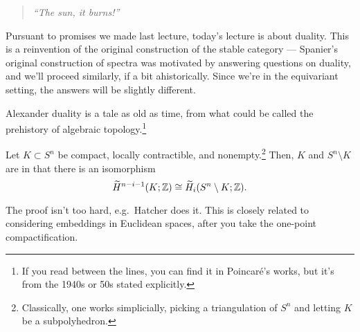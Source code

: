 \begin{quote}\textit{
	``The sun, it burns!''
}\end{quote}

Pursuant to promises we made last lecture, today's lecture is about duality. This is a reinvention of the original
construction of the stable category --- Spanier's original construction of spectra was motivated by answering
questions on duality, and we'll proceed similarly, if a bit ahistorically. Since we're in the equivariant setting,
the answers will be slightly different.

Alexander duality is a tale as old as time, from what could be called the prehistory of algebraic
topology.\footnote{If you read between the lines, you can find it in Poincaré's works, but it's from the 1940s or
50s stated explicitly.}
\begin{thm}
Let $K\subset S^n$ be compact, locally contractible, and nonempty.\footnote{Classically, one works simplicially,
picking a triangulation of $S^n$ and letting $K$ be a subpolyhedron.} Then, $K$ and $S^n\setminus K$ are
 in that there is an isomorphism
\[\widetilde H^{n-i-1}(K;\mathbb Z)\cong \widetilde H_i(S^n\setminus K;\mathbb Z).\]
\end{thm}
The proof isn't too hard, e.g.\ Hatcher does it. This is closely related to considering embeddings in Euclidean
spaces, after you take the one-point compactification.


